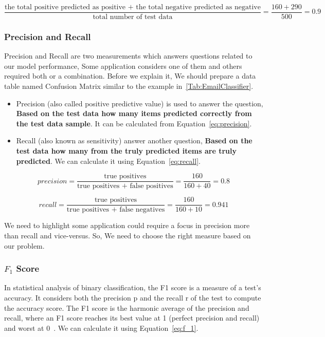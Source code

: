 \begin{equation}\label{eq:accuracy_calculation}
\frac{\text{the total positive predicted as positive + the total negative predicted as negative}}{\text{total number of test data}}  = \frac{160+290}{500}=0.9 
\end{equation}%


\subsubsection{Precision and Recall}

Precision and Recall are two measurements which answers questions related to our model performance, Some application considers one of them and others required both or a combination. Before we explain it, We should prepare a data table named Confusion Matrix similar to the example in~\ref{Tab:EmailClassifier}.
\begin{itemize}
\item Precision (also called positive predictive value) is used to answer the question, \textbf{Based on the test data how many items predicted correctly from the test data sample}. It can be calculated from Equation~\eqref{eq:precision}.

\item Recall (also known as sensitivity) answer another question, \textbf{Based on the test data how many from the truly predicted items are truly predicted}. We can calculate it using Equation~\eqref{eq:recall}.

  \end{itemize}

\begin{equation}\label{eq:precision}
precision = \frac{\text{true positives}}{\text{true positives + false positives}} = \frac{160}{160 + 40}=0.8
\end{equation}%


\begin{equation}\label{eq:recall}
recall = \frac{\text{true positives}}{\text{true positives + false negatives}} = \frac{160}{160 + 10}=0.941
\end{equation}%

We need to highlight some application could require a focus in precision more than recall and vice-versus. So, We need to choose the right measure based on our problem.
  
\subsubsection{$F_1$ Score}
In statistical analysis of binary classification, the F1 score is a measure of a test's accuracy. It considers both the precision p and the recall r of the test to compute the accuracy score. The F1 score is the harmonic average of the precision and recall, where an F1 score reaches its best value at 1 (perfect precision and recall) and worst at 0~\cite{Wiki_f1_score}. We can calculate it using Equation~\eqref{eq:f_1}.

